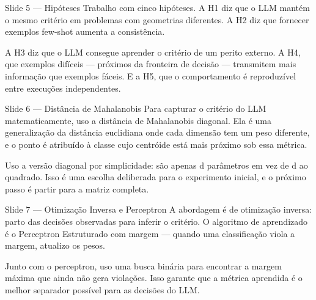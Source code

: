 \documentclass[aspectratio=169, 14pt]{beamer}
\begin{document}
\begin{frame}{Slide 5 — Hipóteses}
  Trabalho com cinco hipóteses. A H1 diz que o LLM mantém o mesmo critério em problemas com geometrias diferentes. A H2 diz que fornecer exemplos few-shot aumenta a consistência.

  A H3 diz que o LLM consegue aprender o critério de um perito externo. A H4, que exemplos difíceis — próximos da fronteira de decisão — transmitem mais informação que exemplos fáceis. E a H5, que o comportamento é reproduzível entre execuções independentes.
\end{frame}

\begin{frame}{Slide 6 — Distância de Mahalanobis}
  Para capturar o critério do LLM matematicamente, uso a distância de Mahalanobis diagonal. Ela é uma generalização da distância euclidiana onde cada dimensão tem um peso diferente, e o ponto é atribuído à classe cujo centróide está mais próximo sob essa métrica.

  Uso a versão diagonal por simplicidade: são apenas d parâmetros em vez de d ao quadrado. Isso é uma escolha deliberada para o experimento inicial, e o próximo passo é partir para a matriz completa.
\end{frame}

\begin{frame}{Slide 7 — Otimização Inversa e Perceptron}
  A abordagem é de otimização inversa: parto das decisões observadas para inferir o critério. O algoritmo de aprendizado é o Perceptron Estruturado com margem — quando uma classificação viola a margem, atualizo os pesos.

  Junto com o perceptron, uso uma busca binária para encontrar a margem máxima que ainda não gera violações. Isso garante que a métrica aprendida é o melhor separador possível para as decisões do LLM.
\end{frame}
\end{document}
